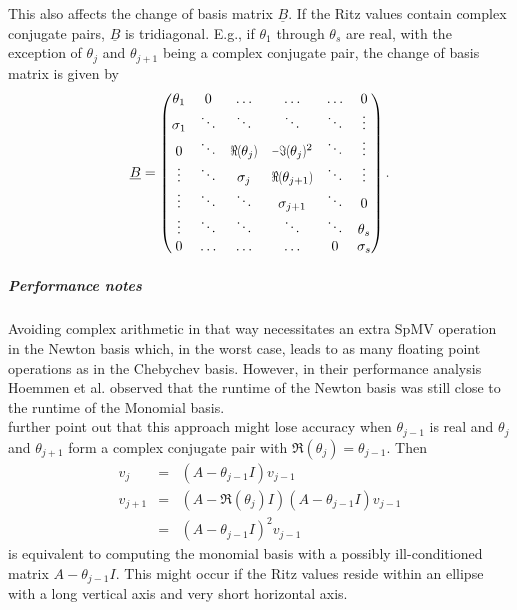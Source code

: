 \documentclass{scrartcl}
\begin{document}
This also affects the change of basis matrix $\underline{B}$. If the Ritz values contain complex conjugate pairs, $\underline{B}$ is tridiagonal. E.g., if $\theta_1$ through $\theta_s$ are real, with the exception of $\theta_j$ and $\theta_{j + 1}$ being a complex conjugate pair, the change of basis matrix is given by
\begin{equation*}
\iffalse
\begin{matrix}
\ddots & \ddots & \ddots & \ddots & \\
& \sigma_{j - 1} & $\scalebox{.7}[1]{$\Re$(}$ \theta_j$\scalebox{.7}[1]{$)$}$ & $\scalebox{.7}[1]{$-\Im($}$\theta_j$\scalebox{.7}[1]{$)$}$^2 & \\
& 0 & \sigma_j & $\scalebox{.7}[1]{$\Re$(}$ \theta_{j + 1}$\scalebox{.7}[1]{$)$}$ & \\
& & 0 & \sigma_{j + 1} & \\
& & \ddots & \ddots & \ddots \\
\end{matrix}
\fi
\underline{B} =
\begin{pmatrix}
\theta_1 & 0 & \ldots & \ldots & \ldots & 0 \\
\sigma_1 & \ddots & \ddots & \ddots & \ddots & \vdots \\
0 & \ddots & $\scalebox{.7}[1]{$\Re$(}$ \theta_j$\scalebox{.7}[1]{$)$}$ & $\scalebox{.7}[1]{$-\Im($}$\theta_j$\scalebox{.7}[1]{$)$}$^2 & \ddots & \vdots \\
\vdots & \ddots & \sigma_j & $\scalebox{.7}[1]{$\Re$(}$ \theta_{j + 1}$\scalebox{.7}[1]{$)$}$ & \ddots & \vdots \\
\vdots & \ddots & \ddots & \sigma_{j + 1} & \ddots & 0 \\
\vdots & \ddots & \ddots & \ddots & \ddots & \theta_s \\
0 & \ldots & \ldots & \ldots & 0 & \sigma_s \\
\end{pmatrix}.
\end{equation*}

\subparagraph{Performance notes}
Avoiding complex arithmetic in that way necessitates an extra SpMV operation in the Newton basis which, in the worst case, leads to as many floating point operations as in the Chebychev basis. However, in their performance analysis Hoemmen et al. \cite{Hoemmen:2010:CKS:1970638} observed that the runtime of the Newton basis was still close to the runtime of the Monomial basis. \\
\cite{Hoemmen:2010:CKS:1970638} further point out that this approach might lose accuracy when $\theta_{j - 1}$ is real and $\theta_j$ and $\theta_{j + 1}$ form a complex conjugate pair with $\Re(\theta_j) = \theta_{j - 1} $. Then
\begin{eqnarray*}
v_j &=& (A - \theta_{j - 1} I )v_{j - 1} \\
v_{j + 1} &=& (A - \Re(\theta_j) I )(A - \theta_{j - 1} I )v_{j - 1} \\
		  &=& (A - \theta_{j - 1} I )^2v_{j - 1}
\end{eqnarray*}
is equivalent to computing the monomial basis with a possibly ill-conditioned  matrix $A - \theta_{j - 1} I$. This might occur if the Ritz values reside within an ellipse with a long vertical axis and very short horizontal axis.
\end{document}
